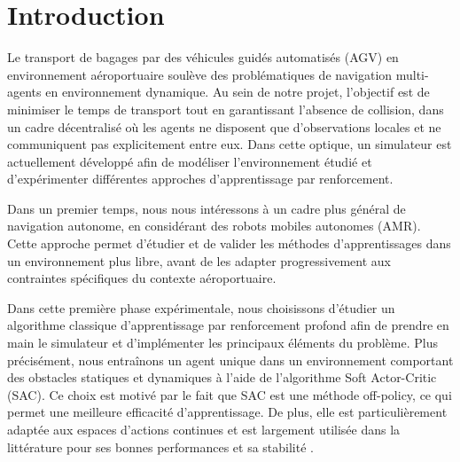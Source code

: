 \section*{ Introduction }

\noindent Le transport de bagages par des véhicules guidés automatisés (AGV) en environnement aéroportuaire soulève des problématiques de navigation multi-agents en environnement dynamique. Au sein de notre projet, l'objectif est de minimiser le temps de transport tout en garantissant l'absence de collision, dans un cadre décentralisé où les agents ne disposent que d'observations locales et ne communiquent pas explicitement entre eux. Dans cette optique, un simulateur est actuellement développé afin de modéliser l’environnement étudié et d’expérimenter différentes approches d’apprentissage par renforcement. 

\vspace{10pt}

\noindent Dans un premier temps, nous nous intéressons à un cadre plus général de navigation autonome, en considérant des robots mobiles autonomes (AMR). Cette approche permet d'étudier et de valider les méthodes d'apprentissages dans un environnement plus libre, avant de les adapter progressivement aux contraintes spécifiques du contexte aéroportuaire.

\vspace{10pt}

\noindent Dans cette première phase expérimentale, nous choisissons d'étudier un algorithme classique d'apprentissage par renforcement profond afin de prendre en main le simulateur et d'implémenter les principaux éléments du problème. Plus précisément, nous entraînons un agent unique dans un environnement comportant des obstacles statiques et dynamiques à l'aide de l'algorithme Soft Actor-Critic (SAC). Ce choix est motivé par le fait que SAC est une méthode off-policy, ce qui permet une meilleure efficacité d'apprentissage. De plus, elle est particulièrement adaptée aux espaces d'actions continues et est largement utilisée dans la littérature pour ses bonnes performances et sa stabilité \citep{haarnoja2018sac, openai2023}. 